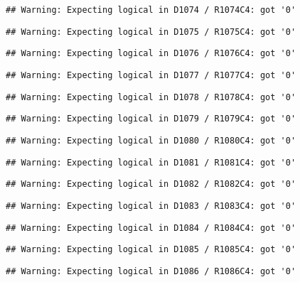 \documentclass[
]{article}
\begin{document}
\begin{verbatim}
## Warning: Expecting logical in D1074 / R1074C4: got '0'
\end{verbatim}

\begin{verbatim}
## Warning: Expecting logical in D1075 / R1075C4: got '0'
\end{verbatim}

\begin{verbatim}
## Warning: Expecting logical in D1076 / R1076C4: got '0'
\end{verbatim}

\begin{verbatim}
## Warning: Expecting logical in D1077 / R1077C4: got '0'
\end{verbatim}

\begin{verbatim}
## Warning: Expecting logical in D1078 / R1078C4: got '0'
\end{verbatim}

\begin{verbatim}
## Warning: Expecting logical in D1079 / R1079C4: got '0'
\end{verbatim}

\begin{verbatim}
## Warning: Expecting logical in D1080 / R1080C4: got '0'
\end{verbatim}

\begin{verbatim}
## Warning: Expecting logical in D1081 / R1081C4: got '0'
\end{verbatim}

\begin{verbatim}
## Warning: Expecting logical in D1082 / R1082C4: got '0'
\end{verbatim}

\begin{verbatim}
## Warning: Expecting logical in D1083 / R1083C4: got '0'
\end{verbatim}

\begin{verbatim}
## Warning: Expecting logical in D1084 / R1084C4: got '0'
\end{verbatim}

\begin{verbatim}
## Warning: Expecting logical in D1085 / R1085C4: got '0'
\end{verbatim}

\begin{verbatim}
## Warning: Expecting logical in D1086 / R1086C4: got '0'
\end{verbatim}
\end{document}
